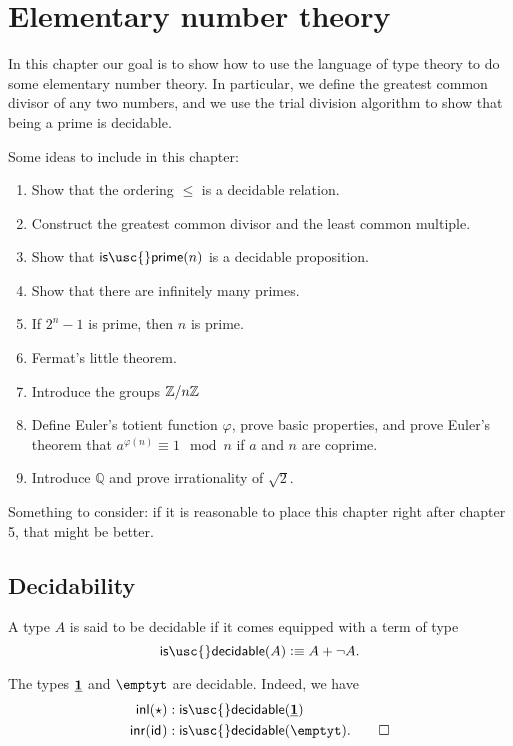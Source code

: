 \chapter{Elementary number theory}

In this chapter our goal is to show how to use the language of type theory to do some elementary number theory. In particular, we define the greatest common divisor of any two numbers, and we use the trial division algorithm to show that being a prime is decidable.

Some ideas to include in this chapter:
\begin{enumerate}
\item Show that the ordering $\leq$ is a decidable relation.
\item Construct the greatest common divisor and the least common multiple.
\item Show that $\mathsf{is\usc{}prime}(n)$ is a decidable proposition.
\item Show that there are infinitely many primes.
\item If $2^n-1$ is prime, then $n$ is prime.
\item Fermat's little theorem.
\item Introduce the groups $\mathbb{Z}/n\mathbb{Z}$
\item Define Euler's totient function $\varphi$, prove basic properties, and prove Euler's theorem that $a^{\varphi(n)}\equiv 1 \mod n$ if $a$ and $n$ are coprime.
\item Introduce $\mathbb{Q}$ and prove irrationality of $\sqrt{2}$.
\end{enumerate}

Something to consider: if it is reasonable to place this chapter right after chapter 5, that might be better.


\section{Decidability}

\begin{defn}
  A type $A$ is said to be decidable if it comes equipped with a term of type
  \begin{equation*}
    \mathsf{is\usc{}decidable}(A)\defeq A+\neg A.
  \end{equation*}
\end{defn}

\begin{eg}
  The types $\underline{\mathbf{1}}$ and $\emptyt$ are decidable. Indeed, we have
  \begin{align*}
    \inl(\ttt) & :\mathsf{is\usc{}decidable}(\unit) \\
    \inr(\idfunc) & : \mathsf{is\usc{}decidable}(\emptyt).\qedhere
  \end{align*}
\end{eg}

